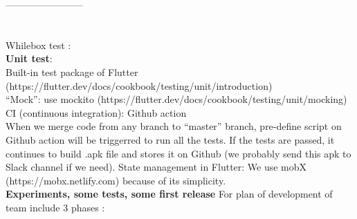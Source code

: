 \documentclass{article}
\begin{document}
     
             ------------------------\\ \\ \\
       
    Whilebox test :   \\
    \textbf{Unit test}: \\
        Built-in test package of Flutter (https://flutter.dev/docs/cookbook/testing/unit/introduction) \\
        “Mock”: use mockito (https://flutter.dev/docs/cookbook/testing/unit/mocking) \\
        CI (continuous integration): Github action \\
        When we merge code from any branch to “master” branch, pre-define script on Github action will be triggerred to run all the tests. If the tests are passed, it continues to build .apk file and stores it on Github (we probably send this apk to Slack channel if we need).
        State management in Flutter: We use mobX (https://mobx.netlify.com) because of its simplicity.\\
\textbf{Experiments, some tests, some first release} 
    For plan of development of team include 3 phases :   
\end{document}
